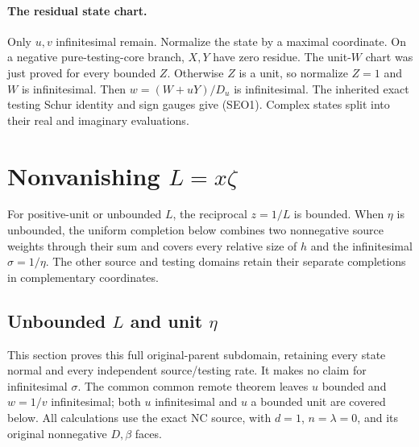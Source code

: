 \paragraph{The residual state chart.}
Only $u,v$ infinitesimal remain. Normalize the state by a maximal
coordinate. On a negative pure-testing-core branch, $X,Y$ have
zero residue. The unit-$W$ chart was just proved for every bounded
$Z$. Otherwise $Z$ is a unit, so normalize $Z=1$ and $W$ is
infinitesimal. Then $w=(W+uY)/D_u$ is infinitesimal. The inherited
exact testing Schur identity and sign gauges give (SEO1).
Complex states split into their real and imaginary evaluations.



\section{Nonvanishing \texorpdfstring{$L=x\zeta$}{L=x zeta}}
For positive-unit or unbounded $L$, the reciprocal $z=1/L$ is bounded. When $\eta$ is unbounded, the uniform completion below combines two nonnegative source weights through their sum and covers every relative size of $h$ and the infinitesimal $\sigma=1/\eta$. The other source and testing domains retain their separate completions in complementary coordinates.

\subsection{Unbounded $L$ and unit $\eta$}

\label{component:pd4b92bf7de71}

\label{pd4b92bf7de71:sec:c14-large-l-unit}
This section proves this full original-parent subdomain, retaining every
state normal and every independent source/testing rate. It makes no claim
for infinitesimal $\sigma$. The common common remote theorem leaves
$u$ bounded and $w=1/v$ infinitesimal; both $u$ infinitesimal and $u$ a
bounded unit are covered below. All calculations use the exact NC source,
with $d=1$, $n=\lambda=0$, and its original nonnegative $D,\beta$ faces.

